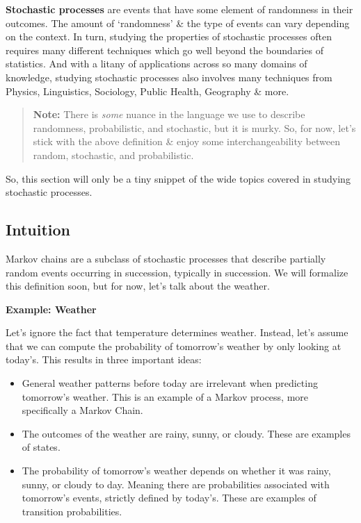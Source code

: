 \documentclass[
]{book}
\providecommand{\tightlist}{%
  \setlength{\itemsep}{0pt}\setlength{\parskip}{0pt}}
\begin{document}
\textbf{Stochastic processes} are events that have some element of randomness in their outcomes. The amount of `randomness' \& the type of events can vary depending on the context. In turn, studying the properties of stochastic processes often requires many different techniques which go well beyond the boundaries of statistics. And with a litany of applications across so many domains of knowledge, studying stochastic processes also involves many techniques from Physics, Linguistics, Sociology, Public Health, Geography \& more.

\begin{quote}
\textbf{Note:} There is \emph{some} nuance in the language we use to describe randomness, probabilistic, and stochastic, but it is murky. So, for now, let's stick with the above definition \& enjoy some interchangeability between random, stochastic, and probabilistic.
\end{quote}

So, this section will only be a tiny snippet of the wide topics covered in studying stochastic processes.

\hypertarget{intuition}{%
\subsection*{Intuition}\label{intuition}}

Markov chains are a subclass of stochastic processes that describe partially random events occurring in succession, typically in succession. We will formalize this definition soon, but for now, let's talk about the weather.

\textbf{Example: Weather}

Let's ignore the fact that temperature determines weather. Instead, let's assume that we can compute the probability of tomorrow's weather by only looking at today's. This results in three important ideas:

\begin{itemize}
\tightlist
\item
  General weather patterns before today are irrelevant when predicting tomorrow's weather. This is an example of a Markov process, more specifically a Markov Chain.
\item
  The outcomes of the weather are rainy, sunny, or cloudy. These are examples of states.
\item
  The probability of tomorrow's weather depends on whether it was rainy, sunny, or cloudy to day. Meaning there are probabilities associated with tomorrow's events, strictly defined by today's. These are examples of transition probabilities.
\end{itemize}
\end{document}
